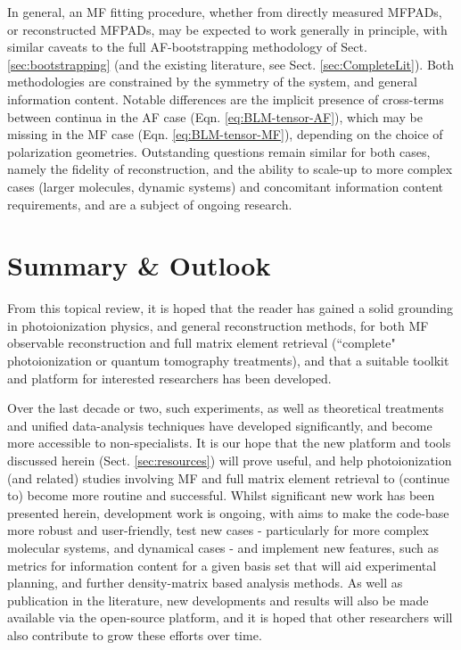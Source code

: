 \documentclass[10pt]{article}
\begin{document}
In general, an MF fitting procedure, whether from directly measured MFPADs, or reconstructed MFPADs, may be expected to work generally in principle, with similar caveats to the full AF-bootstrapping methodology of Sect. \ref{sec:bootstrapping} (and the existing literature, see Sect. \ref{sec:CompleteLit}). Both methodologies are constrained by the symmetry of the system, and general information content. Notable differences are the implicit presence of cross-terms between continua in the AF case (Eqn. \ref{eq:BLM-tensor-AF}), which may be missing in the MF case (Eqn. \ref{eq:BLM-tensor-MF}), depending on the choice of polarization geometries.
Outstanding questions remain similar for both cases, namely the fidelity of reconstruction, and the ability to scale-up to more complex cases (larger molecules, dynamic systems) and concomitant information content requirements, and are a subject of ongoing research.






\section{Summary \& Outlook \label{sec:summary-outlook}}

From this topical review, it is hoped that the reader has gained a solid grounding in photoionization physics, and general reconstruction methods, for both MF observable reconstruction and full matrix element retrieval (``complete" photoionization or quantum tomography treatments), and that a suitable toolkit and platform for interested researchers has been developed. 

Over the last decade or two, such experiments, as well as theoretical treatments and unified data-analysis techniques have developed significantly, and become more accessible to non-specialists. It is our hope 
that the new platform and tools discussed herein (Sect. \ref{sec:resources}) will prove useful, and help photoionization (and related) studies involving MF and full matrix element retrieval to (continue to) become more routine and successful. Whilst significant new work has been presented herein, development work is ongoing, with aims to make the code-base more robust and user-friendly, test new cases - particularly for more complex molecular systems, and dynamical cases - and implement new features, such as metrics for information content for a given basis set that will aid experimental planning, and further density-matrix based analysis methods. As well as publication in the literature, new developments and results will also be made available via the open-source platform, and it is hoped that other researchers will also contribute to grow these efforts over time.
\end{document}

